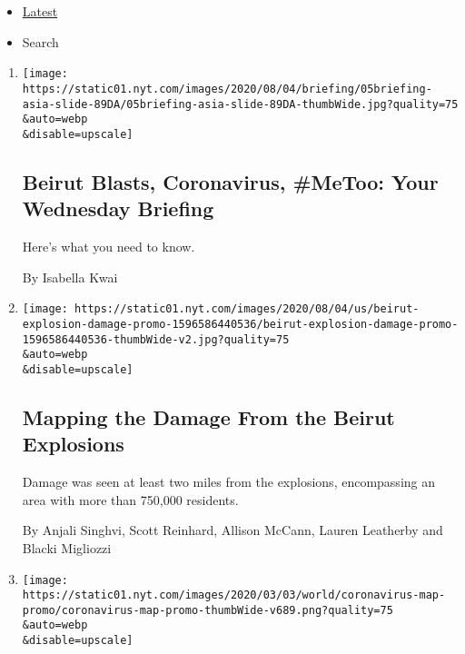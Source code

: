 \begin{itemize}
\tightlist
\item
  \protect\hyperlink{stream-panel}{Latest}
\item
  Search
\end{itemize}

\begin{enumerate}
\def\labelenumi{\arabic{enumi}.}
\item
  \href{/2020/08/05/briefing/beirut-blasts-coronavirus-metoo.html}{}

  \texttt{[image: https://static01.nyt.com/images/2020/08/04/briefing/05briefing-asia-slide-89DA/05briefing-asia-slide-89DA-thumbWide.jpg?quality=75\\\&auto=webp\\\&disable=upscale]}

  \hypertarget{beirut-blasts-coronavirus-metoo-your-wednesday-briefing}{%
  \subsection{Beirut Blasts, Coronavirus, \#MeToo: Your Wednesday
  Briefing}\label{beirut-blasts-coronavirus-metoo-your-wednesday-briefing}}

  Here's what you need to know.

  By Isabella Kwai
\item
  \href{/interactive/2020/08/04/world/middleeast/beirut-explosion-damage.html}{}

  \texttt{[image: https://static01.nyt.com/images/2020/08/04/us/beirut-explosion-damage-promo-1596586440536/beirut-explosion-damage-promo-1596586440536-thumbWide-v2.jpg?quality=75\\\&auto=webp\\\&disable=upscale]}

  \hypertarget{mapping-the-damage-from-the-beirut-explosions}{%
  \subsection{Mapping the Damage From the Beirut
  Explosions}\label{mapping-the-damage-from-the-beirut-explosions}}

  Damage was seen at least two miles from the explosions, encompassing
  an area with more than 750,000 residents.

  By Anjali Singhvi, Scott Reinhard, Allison McCann, Lauren Leatherby
  and Blacki Migliozzi
\item
  \href{/2020/08/04/us/coronavirus-today.html}{}

  \texttt{[image: https://static01.nyt.com/images/2020/03/03/world/coronavirus-map-promo/coronavirus-map-promo-thumbWide-v689.png?quality=75\\\&auto=webp\\\&disable=upscale]}


\end{enumerate}
